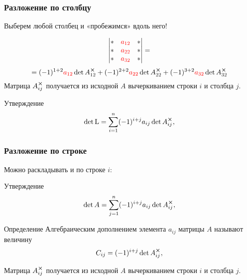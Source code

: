 \begin{frame}
    \frametitle{Разложение по столбцу}

    Выберем любой столбец и «пробежимся» вдоль него!

    \[
        \begin{vmatrix}
            * & \textcolor{red}{a_{12}} & * \\
            * & \textcolor{red}{a_{22}} & * \\
            * & \textcolor{red}{a_{32}} & * \\
        \end{vmatrix}  =      
    \]
    \[ 
       =(-1)^{1+2} \textcolor{red}{a_{12}} \det A_{12}^{\cross} +
        (-1)^{2+2} \textcolor{red}{a_{22}} \det A_{22}^{\cross} +
        (-1)^{3+2} \textcolor{red}{a_{32}} \det A_{32}^{\cross}
    \]
    Матрица $A_{ij}^{\cross}$ получается из исходной $A$ вычеркиванием строки $i$ и
    столбца $j$.
    \pause
    \begin{block}{Утверждение}       
    \[
    \det \operatorname{L} = \sum_{i=1}^{n} (-1)^{i+j} a_{ij} \det A_{ij}^{\cross},
    \]
    \end{block}

    
\end{frame}


\begin{frame}
    \frametitle{Разложение по строке}

    Можно раскладывать и по строке $i$:
\begin{block}{Утверждение}
\[
\det A = \sum_{j=1}^{n} (-1)^{i+j} a_{ij} \det A_{ij}^{\cross},
\]
\end{block}

    \begin{block}{Определение}
        \alert{Алгебраическим дополнением} элемента $a_{ij}$ матрицы $A$ называют величину
        \[
         C_{ij} = (-1)^{i+j} \det A_{ij}^{\cross},    
        \]
    \end{block}

    Матрица $A_{ij}^{\cross}$ получается из исходной $A$ вычеркиванием строки $i$ и
    столбца $j$.

\end{frame}